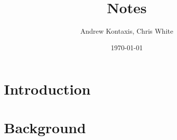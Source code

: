 \documentclass[11pt,a4paper]{article}
\title{Notes}
\author{Andrew Kontaxis, Chris White}
\date{\today}
\begin{document}
\maketitle

\section{Introduction}
\section{Background}
%
\end{document}
